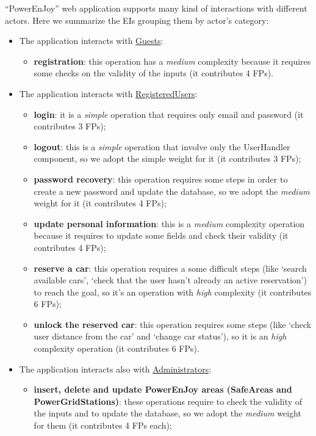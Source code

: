 ``PowerEnJoy'' web application supports many kind of interactions with different actors.
Here we summarize the EIs grouping them by actor's category:
\begin{itemize}
	\item The application interacts with \underline{Guests}:
		\begin{itemize}
			\item \textbf{registration}: this operation has a \textit{medium} complexity because it requires some checks on the validity of the inputs (it contributes 4 FPs).
		\end{itemize}
	\item The application interacts with \underline{RegisteredUsers}:
		\begin{itemize}
			\item \textbf{login}: it is a \textit{simple} operation that requires only email and password (it contributes 3 FPs);
			\item \textbf{logout}: this is a \textit{simple} operation that involve only the UserHandler component, so we adopt the simple weight for it (it contributes 3 FPs);
			\item \textbf{password recovery}: this operation requires some steps in order to create a new password and update the database, so we adopt the \textit{medium} weight for it (it contributes 4 FPs);
			\item \textbf{update personal information}: this is a \textit{medium} complexity operation because it requires to update some fields and check their validity (it contributes 4 FPs);
			\item \textbf{reserve a car}: this operation requires a some difficult steps (like `search available cars', `check that the user hasn't already an active reservation') to reach the goal, so it's an operation with \textit{high} complexity (it contributes 6 FPs);
			\item \textbf{unlock the reserved car}: this operation requires some steps (like `check user distance from the car' and `change car status'), so it is an \textit{high} complexity operation (it contributes 6 FPs).
		\end{itemize}
	\item The application interacts also with \underline{Administrators}:
		\begin{itemize}
			\item \textbf{insert, delete and update PowerEnJoy areas (SafeAreas and PowerGridStations)}: these operations require to check the validity of the inputs and to update the database, so we adopt the \textit{medium} weight for them (it contributes 4 FPs each);

\end{itemize}
\end{itemize}
